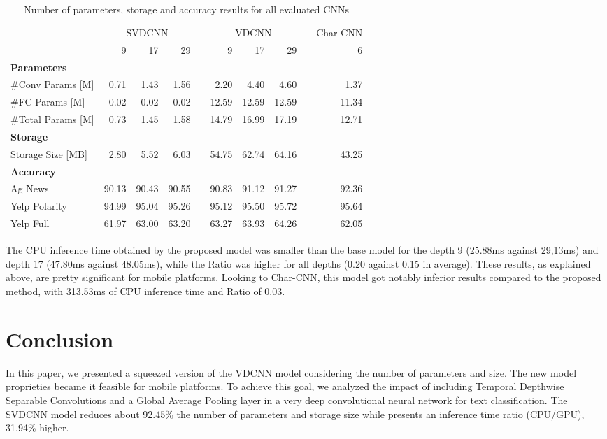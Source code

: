 \documentclass[conference]{IEEEtran}
\newcommand{\ra}[1]{\renewcommand{\arraystretch}{#1}}
\begin{document}
\begin{table*}[htpb]\centering
\caption{Number of parameters, storage and accuracy results for all evaluated CNNs}
\label{comparison_results}
\ra{1.3}
\begin{tabular}{@{}lrrrcrrrcr@{}}\toprule
& \multicolumn{3}{c}{SVDCNN} & \phantom{abc}& \multicolumn{3}{c}{VDCNN} &
\phantom{abc} & Char-CNN\\
\cmidrule{2-4} \cmidrule{6-8}  \cmidrule{10-10}
& 9 & 17 & 29 && 9 & 17 & 29 && 6\\ \midrule
\textbf{Parameters}\\
\#Conv Params [M] & 0.71 & 1.43 & 1.56 && 2.20 & 4.40 & 4.60 && 1.37\\
\#FC Params [M] & 0.02 & 0.02 & 0.02 && 12.59 & 12.59 & 12.59 && 11.34\\
\#Total Params [M] & 0.73 & 1.45 & 1.58 && 14.79 & 16.99 & 17.19 && 12.71\vspace{5px}
\\
\textbf{Storage}\\
Storage Size [MB] & 2.80 & 5.52 & 6.03 && 54.75 & 62.74 & 64.16 && 43.25\vspace{5px}
\\
\textbf{Accuracy}\\
Ag News & 90.13& 90.43&90.55& & 90.83& 91.12& 91.27&& 92.36\\
Yelp Polarity &94.99& 95.04& 95.26&& 95.12& 95.50& 95.72&& 95.64\\ 
Yelp Full &61.97& 63.00& 63.20&& 63.27& 63.93& 64.26&& 62.05\vspace{5px}
\\
\bottomrule
\end{tabular}
\end{table*}

\noindent The CPU inference time obtained by the proposed model was smaller than the base model for the depth 9 (25.88ms against 29,13ms) and depth 17 (47.80ms against 48.05ms), while the Ratio was higher for all depths (0.20 against 0.15 in average). These results, as explained above, are pretty significant for mobile platforms. Looking to Char-CNN, this model got notably inferior results compared to the proposed method, with 313.53ms of CPU inference time and Ratio of 0.03.

\section{Conclusion}
In this paper, we presented a squeezed version of the VDCNN model considering the number of parameters and size. The new model proprieties became it feasible for mobile platforms. To achieve this goal, we analyzed the impact of including Temporal Depthwise Separable Convolutions and a Global Average Pooling layer in a very deep convolutional neural network for text classification. The SVDCNN model reduces about 92.45\% the number of parameters and storage size while presents an inference time ratio (CPU/GPU), 31.94\% higher.  
\end{document}
